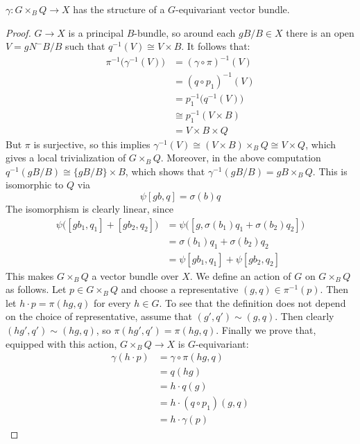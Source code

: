 \begin{proposition}
\label{prop:eqvb}
$\gamma : G\times_B Q \to X$ has the structure of a $G$-equivariant vector bundle.
\end{proposition}
\begin{proof}
$G \to X$ is a principal $B$-bundle, so around each $gB/B \in X$ there is an open $V = gN^-B/B$ such that $q^{-1}(V) \cong
V \times B$.  It follows that:
\begin{align*}
\pi^{-1} \big(\gamma^{-1}(V) \big) &= (\gamma \circ \pi)^{-1}(V) \\
&= (q \circ p_1)^{-1}(V) \\
&= p_1^{-1} \big(q^{-1}(V) \big) \\
&\cong p_1^{-1} (V \times B) \\
&= V \times B \times Q
\end{align*}
But $\pi$ is surjective, so this implies $\gamma^{-1}(V) \cong (V \times B)\times_B Q \cong V \times Q$, which gives a local
trivialization of $G\times_B Q$. Moreover, in the above computation $q^{-1}(gB/B) \cong \{gB/B\} \times B$, which shows 
that $\gamma^{-1}(gB/B) = gB \times_B Q$. This is isomorphic to $Q$ via
\[	\psi [gb, q] = \sigma(b) q	\]
The isomorphism is clearly linear, since
\begin{align*}
 \psi \big( [gb_1,q_1] + [gb_2, q_2] \big) &= \psi \big( [g, \sigma(b_1)q_1 + \sigma(b_2)q_2] \big) \\
&= \sigma(b_1)q_1 + \sigma(b_2)q_2 \\
&= \psi [gb_1, q_1] + \psi[gb_2,q_2]
\end{align*}
This makes $G\times_B Q$ a vector bundle over $X$. We define an action of $G$ on $G\times_B Q$ as follows. 
Let $p \in G\times_B Q$ and choose a representative $(g,q) \in \pi^{-1}
(p)$. Then let $h \cdot p = \pi (hg, q)$ for every $h \in G$. To see that the definition does not depend on the choice of
representative, assume that $(g',q') \sim (g,q)$. Then clearly $(hg',q') \sim (hg,q)$, so $\pi(hg',q') = \pi(hg,q)$. Finally
we prove that, equipped with this action, $G\times_B Q \to X$ is $G$-equivariant:
\begin{align*}
\gamma(h \cdot p) &= \gamma \circ \pi (hg, q) \\
&= q(hg) \\
&= h \cdot q(g) \\
&= h \cdot (q \circ p_1)(g,q) \\
&= h \cdot \gamma(p)
\end{align*}
\end{proof}


